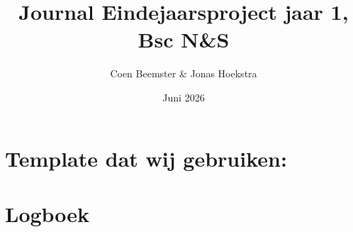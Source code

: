 \documentclass{article}
\title{Journal Eindejaarsproject jaar 1, Bsc N\&S}
\author{Coen Beemster \& Jonas Hoekstra}
\date{Juni 2026}
\begin{document}
\maketitle

\section{Template dat wij gebruiken:}


\newpage 
\section{Logboek}







































\end{document}
